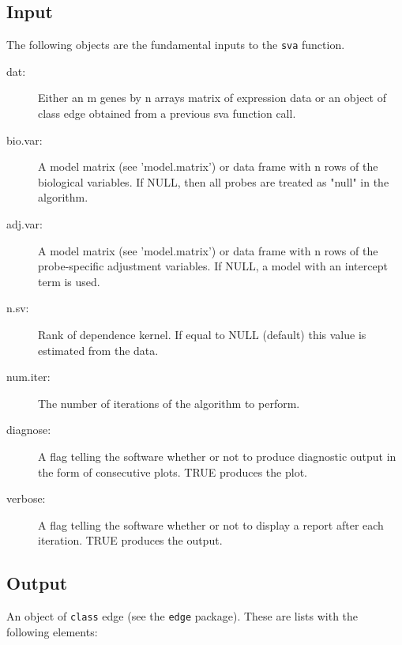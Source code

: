 \documentclass[11pt]{article}
\newcommand{\Rfunction}[1]{{\texttt{#1}}}
\newcommand{\Rpackage}[1]{{\texttt{#1}}}
\newcommand{\Rclass}[1]{{\texttt{#1}}}
\begin{document}
\subsection{Input}
The following objects are the fundamental inputs to the \Rfunction{sva}
function.
\begin{description}
\item[dat:] Either an m genes by n arrays matrix of expression data or an object
of class edge obtained from a previous sva function call.
\item[bio.var:] A model matrix (see 'model.matrix') or data frame with n rows of
the biological variables. If NULL, then all probes are treated as "null" in the algorithm.
\item[adj.var:] A model matrix (see 'model.matrix') or data frame with n rows of
the probe-specific adjustment variables.  If NULL, a model with an intercept term is used.
\item[n.sv:] Rank of dependence kernel.  If equal to NULL (default) this value is
estimated from the data.
\item[num.iter:] The number of iterations of the algorithm to perform.
\item[diagnose:] A flag telling the software whether or not to produce diagnostic
output in the form of consecutive plots. TRUE produces the plot.
\item[verbose:] A flag telling the software whether or not to display a report
after each iteration. TRUE produces the output.
\end{description}

\subsection{Output}
An object of \Rclass{class} edge (see the \Rpackage{edge} package).  These are
lists with the following elements:
\end{document}
